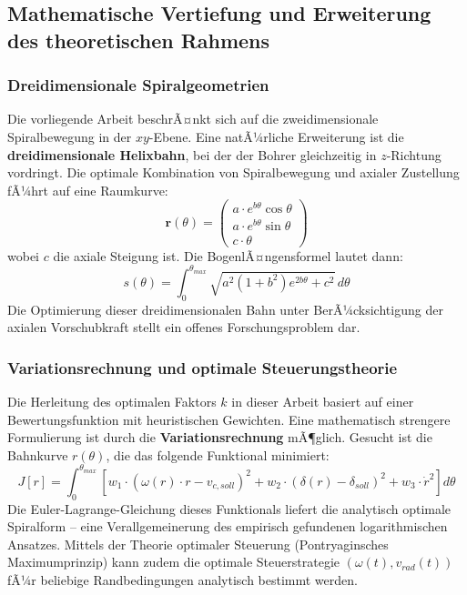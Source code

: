 ﻿\documentclass[12pt,a4paper]{article}
\begin{document}
\subsection{Mathematische Vertiefung und Erweiterung des theoretischen Rahmens}

\subsubsection{Dreidimensionale Spiralgeometrien}

Die vorliegende Arbeit beschrÃ¤nkt sich auf die zweidimensionale Spiralbewegung in der $xy$-Ebene. Eine natÃ¼rliche Erweiterung ist die \textbf{dreidimensionale Helixbahn}, bei der der Bohrer gleichzeitig in $z$-Richtung vordringt. Die optimale Kombination von Spiralbewegung und axialer Zustellung fÃ¼hrt auf eine Raumkurve:
\begin{equation}
    \mathbf{r}(\theta) = \begin{pmatrix} a \cdot e^{b\theta} \cos\theta \\ a \cdot e^{b\theta} \sin\theta \\ c \cdot \theta \end{pmatrix}
\end{equation}
wobei $c$ die axiale Steigung ist. Die BogenlÃ¤ngensformel lautet dann:
\begin{equation}
    s(\theta) = \int_0^{\theta_{max}} \sqrt{a^2(1+b^2)e^{2b\theta} + c^2} \, d\theta
\end{equation}
Die Optimierung dieser dreidimensionalen Bahn unter BerÃ¼cksichtigung der axialen Vorschubkraft stellt ein offenes Forschungsproblem dar.

\subsubsection{Variationsrechnung und optimale Steuerungstheorie}

Die Herleitung des optimalen Faktors $k$ in dieser Arbeit basiert auf einer Bewertungsfunktion mit heuristischen Gewichten. Eine mathematisch strengere Formulierung ist durch die \textbf{Variationsrechnung} mÃ¶glich. Gesucht ist die Bahnkurve $r(\theta)$, die das folgende Funktional minimiert:
\begin{equation}
    J[r] = \int_0^{\theta_{max}} \left[ w_1 \cdot \left(\omega(r) \cdot r - v_{c,soll}\right)^2 + w_2 \cdot \left(\delta(r) - \delta_{soll}\right)^2 + w_3 \cdot \dot{r}^2 \right] d\theta
\end{equation}
Die Euler-Lagrange-Gleichung dieses Funktionals liefert die analytisch optimale Spiralform -- eine Verallgemeinerung des empirisch gefundenen logarithmischen Ansatzes. Mittels der Theorie optimaler Steuerung (Pontryaginsches Maximumprinzip) kann zudem die optimale Steuerstrategie $(\omega(t), v_{rad}(t))$ fÃ¼r beliebige Randbedingungen analytisch bestimmt werden.
\end{document}
